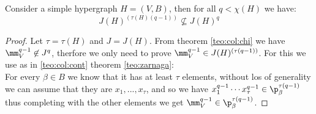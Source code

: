 \begin{teo} \label{teo:borin1}
	Consider a simple hypergraph $H = (V,B)$, then for all $ q < \chi(H)$ we have: 
	\[ J(H)^{( \tau(H)(q-1) )} \not \subseteq J(H)^q \]
\end{teo}

\begin{proof}
	Let $\tau = \tau (H)$ and $ J = J(H) $. From theorem \ref{teo:col:chi} we have $\mm_V^{q-1} \not \in J^q$, therfore we only need to prove $ \mm_V^{q-1} \in J(H)^{( \tau (q-1) )}$. For this we use as in \ref{teo:col:cont} theorem \ref{teo:zarnaga}:\\
For every $\beta \in B $ we know that it has at least $	\tau$ elements, without los of generality we can assume that they are $x_1 , ... , x_\tau$, and so we have $x_1^{q-1} \cdots  x_\tau^{q-1} \in \p_\beta^{\tau(q -1)} $ thus completing with the other elements we get $\mm_V^{q-1} \in \p_\beta^{\tau(q -1)} $. 
\end{proof}
